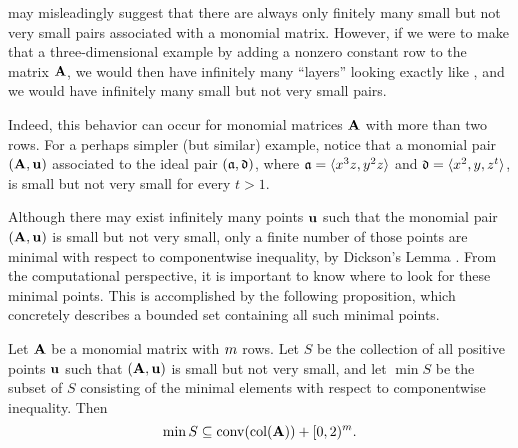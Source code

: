 \documentclass{article}
\begin{document}
\begin{remark}
   \label{rem: there may be infinitely many small but not very small pairs}
    may misleadingly suggest that there are always only finitely many small but not very small pairs associated with a monomial matrix.
   However, if we were to make that a three-dimensional example by adding a nonzero constant row to the matrix $\mathbf{A}$, we would then have infinitely many ``layers'' looking exactly like , and we would have infinitely many small but not very small pairs.

   Indeed, this behavior can occur for monomial matrices $\mathbf{A}$ with more than two rows.
   For a perhaps simpler (but similar) example, notice that a monomial pair $(\mathbf{A}, \mathbf{u})$ associated to the ideal pair $(\mathfrak{a}, \mathfrak{d})$, where $\mathfrak{a}= \langle x^3 z, y^2z \rangle$ and $\mathfrak{d} = \langle x^2, y, z^t \rangle$, is small but not very small for every $t > 1$.
\end{remark}

Although there may exist infinitely many points $\mathbf{u}$ such that the monomial pair $(\mathbf{A},\mathbf{u})$ is small but not very small, only a finite number of those points are minimal with respect to componentwise inequality, by Dickson's Lemma \cite[Lemma~A]{dickson}.
From the computational perspective, it is important to know where to look for these minimal points.
This is accomplished by the following proposition, which concretely describes a bounded set containing all such minimal points.

\begin{proposition}
   \label{prop: where to find minimal smal but not very small points}
   Let $\mathbf{A}$ be a monomial matrix with $m$ rows.
   Let $S$ be the collection of all positive points $\mathbf{u}$ such that $(\mathbf{A},\mathbf{u})$ is small but not very small, and let $\min S$ be the subset of $S$ consisting of the minimal elements with respect to componentwise inequality.
   Then
   \[\min S \subseteq \operatorname{conv}(\operatorname{col}(\mathbf{A})) + [0,2)^m.\]
\end{proposition}
\end{document}
